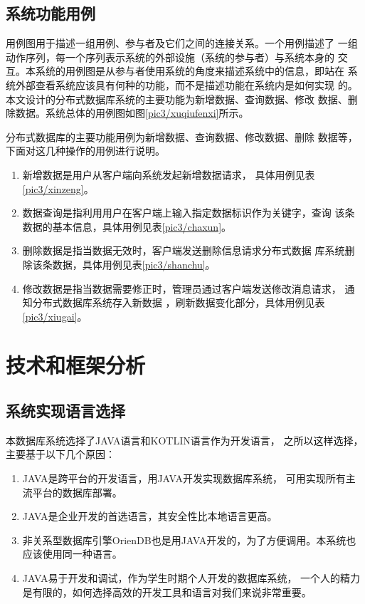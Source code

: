 \subsection{系统功能用例}
用例图用于描述一组用例、参与者及它们之间的连接关系。一个用例描述了
一组动作序列，每一个序列表示系统的外部设施（系统的参与者）与系统本身的
交互。本系统的用例图是从参与者使用系统的角度来描述系统中的信息，即站在
系统外部查看系统应该具有何种的功能，而不是描述功能在系统内是如何实现
的。本文设计的分布式数据库系统的主要功能为新增数据、查询数据、修改
数据、删除数据。系统总体的用例图如图\ref{pic3/xuqiufenxi}所示。

分布式数据库的主要功能用例为新增数据、查询数据、修改数据、删除
数据等，下面对这几种操作的用例进行说明。
\begin{enumerate}[fullwidth,itemindent=2em,listparindent=2em]
	\item 新增数据是用户从客户端向系统发起新增数据请求，
	具体用例见表\ref{pic3/xinzeng}。
	\item 数据查询是指利用用户在客户端上输入指定数据标识作为关键字，查询
	该条数据的基本信息，具体用例见表\ref{pic3/chaxun}。
\item 	删除数据是指当数据无效时，客户端发送删除信息请求分布式数据
	库系统删除该条数据，具体用例见表\ref{pic3/shanchu}。
\item 	修改数据是指当数据需要修正时，管理员通过客户端发送修改消息请求，
	通知分布式数据库系统存入新数据
	，刷新数据变化部分，具体用例见表\ref{pic3/xiugai}。
\end{enumerate}
\section{技术和框架分析}
\subsection{系统实现语言选择}
本数据库系统选择了JAVA语言和KOTLIN语言作为开发语言，
之所以这样选择，主要基于以下几个原因：
\begin{enumerate}[fullwidth,itemindent=2em,listparindent=2em]
	\item JAVA是跨平台的开发语言，用JAVA开发实现数据库系统，
	可用实现所有主流平台的数据库部署。
	\item JAVA是企业开发的首选语言，其安全性比本地语言更高。
	\item 非关系型数据库引擎OrienDB也是用JAVA开发的，为了方便调用。本系统也应该使用同一种语言。
	\item JAVA易于开发和调试，作为学生时期个人开发的数据库系统，
	一个人的精力是有限的，如何选择高效的开发工具和语言对我们来说非常重要。
\end{enumerate}
